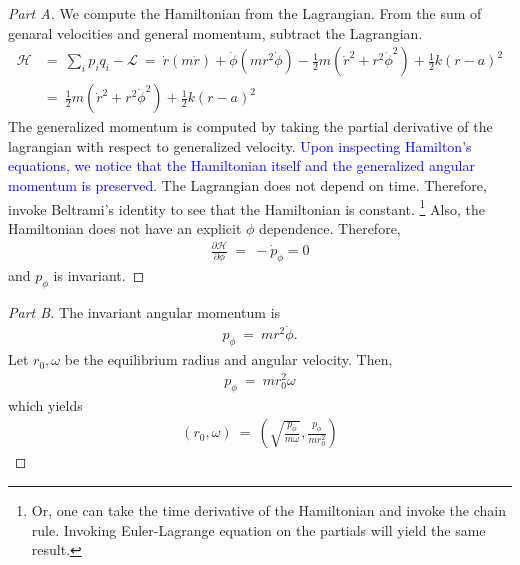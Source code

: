 \documentclass{article}
\numberwithin{equation}{section}
\newcommand{\pderiv}[2]{
\frac {\partial {#1} } {\partial {#2}}
}
\begin{document}
\begin{proof}
    [Part A] We compute the Hamiltonian from the Lagrangian. From 
    the sum of genaral velocities and general momentum, subtract the Lagrangian. 
    \begin{align}
        \mathcal H & = \ \sum_i p_i q_i - \mathcal L \ = \ 
        \dot r(m \dot r) + \dot \phi (mr^2 \dot \phi) - 
        \frac 1 2 m (\dot r^2 + r^2 \dot \phi^2) + \frac 1 2 k (r- a)^2 \\
        & = \ \boxed{
        \frac 1 2 m (\dot r^2 + r^2 \dot \phi^2) + \frac 1 2 k (r- a)^2
        } 
    \end{align}
    The generalized momentum is computed by taking the partial derivative 
    of the lagrangian with respect to generalized velocity. \textcolor{blue}{
        Upon inspecting Hamilton's equations, we notice that the Hamiltonian 
        itself and the generalized angular momentum is preserved. 
    }The Lagrangian does not depend on time. Therefore, invoke Beltrami's identity 
    to see that the Hamiltonian is constant. \footnote{Or, one can take the 
    time derivative of the Hamiltonian and invoke the chain rule. Invoking 
    Euler-Lagrange equation on the partials will yield the same result. } Also, the 
    Hamiltonian does not have an explicit $\phi$ dependence. Therefore, 
    \begin{align}
        \pderiv{\mathcal H}{ \phi} \ = \ -\dot p_\phi = 0
    \end{align}
    and $ p_\phi$ is invariant. 
\end{proof}

\begin{proof} [Part B]
    The invariant angular momentum is 
    \begin{align}
        p_\phi \ = \ m r^2 \dot \phi. 
    \end{align}
    Let $r_0, \omega$ be the equilibrium radius and angular velocity. 
    Then, 
    \begin{align}
        p_\phi \ = \ m r_0^2 \omega 
    \end{align}
    which yields 
    \begin{align}
        (r_0, \omega) \ = \ \left(
            \sqrt{\frac{p_\phi}{m \omega}}, \frac{p_\phi}{mr_0^2}
        \right)
    \end{align}
\end{proof}
\end{document}
